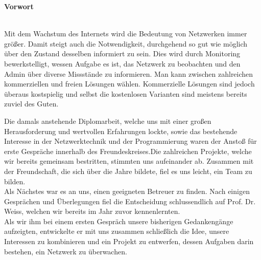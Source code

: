 \documentclass[12pt,a4paper]{report}
\begin{document}

\begin{onehalfspace}

\vspace{1.5cm}
\begin{Huge}
\textbf{Vorwort}
\end{Huge}
\vspace{2cm}
\\Mit dem Wachstum des Internets wird die Bedeutung von Netzwerken immer größer. Damit steigt auch die Notwendigkeit, durchgehend so gut wie möglich über den Zustand desselben informiert zu sein. Dies wird durch Monitoring bewerkstelligt, wessen Aufgabe es ist, das Netzwerk zu beobachten und den Admin über diverse Missstände zu informieren. Man kann zwischen zahlreichen kommerziellen und freien Lösungen wählen. Kommerzielle Lösungen sind jedoch überaus kostspielig und selbst die kostenlosen Varianten sind meistens bereits zuviel des Guten. 

Die damals anstehende Diplomarbeit, welche uns mit einer großen Herausforderung und wertvollen Erfahrungen lockte, sowie das bestehende Interesse in der Netzwerktechnik und der Programmierung waren der Anstoß für erste Gespräche innerhalb des Freundeskreises.Die zahlreichen Projekte, welche wir bereits gemeinsam bestritten, stimmten uns aufeinander ab. Zusammen mit der Freundschaft, die sich über die Jahre bildete, fiel es uns leicht, ein Team zu bilden.\\
Als Nächstes war es an uns, einen geeigneten Betreuer zu finden. Nach einigen Gesprächen und Überlegungen fiel die Entscheidung schlussendlich auf Prof. Dr. Weiss, welchen wir bereits im Jahr zuvor kennenlernten.\\
Als wir ihm bei einem ersten Gespräch unsere bisherigen Gedankengänge aufzeigten, entwickelte er mit uns zusammen schließlich die Idee, unsere Interessen zu kombinieren und ein Projekt zu entwerfen, dessen Aufgaben darin bestehen, ein Netzwerk zu überwachen.

\end{onehalfspace}
\begin{singlespace}
\tableofcontents
\newpage
\end{singlespace}
\pagestyle{fancy}
\end{document}
